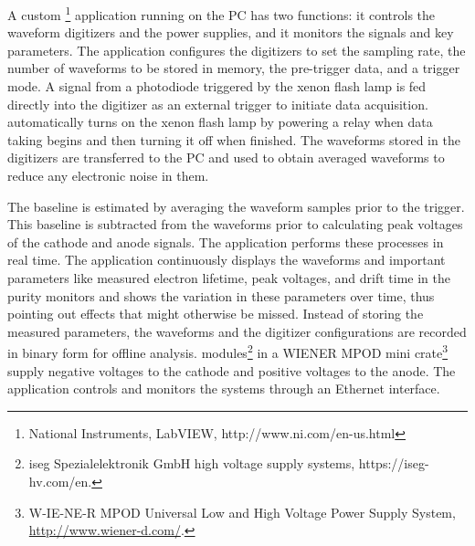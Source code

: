 A custom \footnote{National Instruments, LabVIEW\texttrademark{}, http://www.ni.com/en-us.html} application running on the  PC has two functions: it controls the waveform digitizers and the power supplies, and it monitors the signals and key parameters. The application configures the digitizers to set the sampling rate, the number of waveforms to be stored in memory, the pre-trigger data, and a trigger mode. A signal from a photodiode triggered by the xenon flash lamp is fed directly into the digitizer as an external trigger to initiate data acquisition.   automatically turns on the xenon flash lamp by powering a relay when data taking begins and then turning it off when finished.
The waveforms stored in the digitizers are transferred to the  PC and used to obtain averaged waveforms to reduce any electronic noise in them. %

The baseline  is estimated by averaging the waveform samples prior to the trigger. This baseline is subtracted from the waveforms prior to calculating peak voltages of the cathode and anode signals. %
The application performs these processes in real time. %
 The application continuously displays the waveforms and important parameters like measured electron lifetime, peak voltages, and drift time %
in the purity monitors and shows the variation in these parameters over time, thus pointing out %
effects that might otherwise be missed. %
Instead of storing the measured parameters, the waveforms and the digitizer configurations are recorded in binary form for offline analysis.   modules\footnote{iseg Spezialelektronik GmbH\texttrademark{} high voltage supply systems, https://iseg-hv.com/en.} in a WIENER MPOD mini crate\footnote{W-IE-NE-R MPOD\texttrademark{} Universal Low and High Voltage Power Supply System, \url{http://www.wiener-d.com/}.} supply negative voltages to the cathode and positive voltages to the anode. The  application controls and monitors the  systems through an Ethernet interface.


